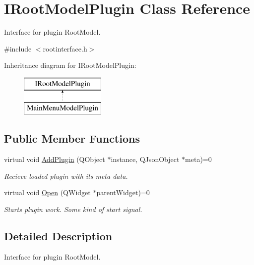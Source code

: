 \hypertarget{class_i_root_model_plugin}{}\section{I\+Root\+Model\+Plugin Class Reference}
\label{class_i_root_model_plugin}


Interface for plugin Root\+Model.  




{\ttfamily \#include $<$rootinterface.\+h$>$}

Inheritance diagram for I\+Root\+Model\+Plugin\+:\begin{figure}[H]
\begin{center}
\leavevmode
\includegraphics[height=2.000000cm]{class_i_root_model_plugin}
\end{center}
\end{figure}
\subsection*{Public Member Functions}
\begin{DoxyCompactItemize}
\item 
virtual void \hyperlink{class_i_root_model_plugin_a6c5a6562b3fc16264d36aa6e39b84a7f}{Add\+Plugin} (Q\+Object $\ast$instance, Q\+Json\+Object $\ast$meta)=0
\begin{DoxyCompactList}\small\item\em Recieve loaded plugin with it\textquotesingle{}s meta data. \end{DoxyCompactList}\item 
virtual void \hyperlink{class_i_root_model_plugin_a9ee55034608480fda71b7700d3495984}{Open} (Q\+Widget $\ast$parent\+Widget)=0
\begin{DoxyCompactList}\small\item\em Starts plugin work. Some kind of \textquotesingle{}start\textquotesingle{} signal. \end{DoxyCompactList}\end{DoxyCompactItemize}


\subsection{Detailed Description}
Interface for plugin Root\+Model. 

